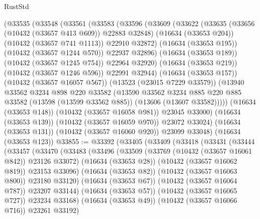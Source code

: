 \begin{lexlean}{RustStd}
\begin{coremodule}
    (@33535
      (@33548
        (@33561
          (@33583
            (@33596
              (@33609
                (@33622
                  (@33635
                    (@33656 (@10432 (@33657 @413 @609)) @22883 @32848)
                    (@16634 (@33653 @204))
                    (@10432 (@33657 @741 @1113))
                    @22910
                    @32872)
                  (@16634 (@33653 @195))
                  (@10432 (@33657 @1244 @570))
                  @22937
                  @32896)
                (@16634 (@33653 @189))
                (@10432 (@33657 @1245 @754))
                @22964
                @32920)
              (@16634 (@33653 @219))
              (@10432 (@33657 @1246 @596))
              @22991
              @32944)
            (@16634 (@33653 @157))
            (@10432 (@33657 @16057 @567))
            (@13523 (@23015 @7229 @33579))
            (@13940
              @33562
              @3234
              @898
              @220
              @33582
              (@13590
                @33562
                @3234
                @885
                @220
                @885
                @33582
                (@13598 (@13599 @33562 @885))
                (@13606 (@13607 @33582)))))
          (@16634 (@33653 @148))
          (@10432 (@33657 @16058 @981))
          @23045
          @33000)
        (@16634 (@33653 @139))
        (@10432 (@33657 @16059 @970))
        @23072
        @33024)
      (@16634 (@33653 @131))
      (@10432 (@33657 @16060 @920))
      @23099
      @33048)
    (@16634 (@33653 @123))
@33855 := @33392
    (@33405
      (@33409
        (@33418
          (@33431
            (@33444
              (@33457
                (@33470
                  (@33483
                    (@33496
                      (@33509
                        (@33769 (@10432 (@33657 @16061 @842)) @23126 @33072)
                        (@16634 (@33653 @28))
                        (@10432 (@33657 @16062 @819))
                        @23153
                        @33096)
                      (@16634 (@33653 @82))
                      (@10432 (@33657 @16063 @800))
                      @23180
                      @33120)
                    (@16634 (@33653 @67))
                    (@10432 (@33657 @16064 @787))
                    @23207
                    @33144)
                  (@16634 (@33653 @57))
                  (@10432 (@33657 @16065 @727))
                  @23234
                  @33168)
                (@16634 (@33653 @49))
                (@10432 (@33657 @16066 @716))
                @23261
                @33192)

\end{coremodule}
\end{lexlean}
